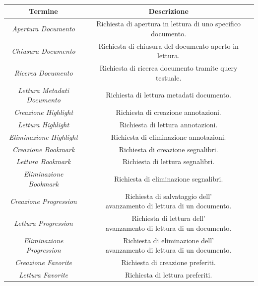 \begin{table}[H]
\centering
    \begin{tabular}{|c|c|}
         \hline
         \textbf{Termine} & \textbf{Descrizione}\\
         \hline
         \textit{Apertura Documento} & Richiesta di apertura in lettura di uno specifico documento.\\
         \hline
         \textit{Chiusura Documento} & Richiesta di chiusura del documento aperto in lettura.\\
         \hline
         \textit{Ricerca Documento} & Richiesta di ricerca documento tramite query testuale.\\
         \hline
         \specialcell{\textit{Lettura Metadati}\\\textit{Documento}} & Richiesta di lettura metadati documento.\\
         \hline
         \textit{Creazione Highlight} & Richiesta di creazione annotazioni.\\
         \hline
         \textit{Lettura Highlight} & Richiesta di lettura annotazioni.\\
         \hline
         \textit{Eliminazione Highlight} & Richiesta di eliminazione annotazioni.\\
         \hline
         \textit{Creazione Bookmark} & Richiesta di creazione segnalibri.\\
         \hline
         \textit{Lettura Bookmark} & Richiesta di lettura segnalibri.\\
         \hline
         \textit{Eliminazione Bookmark} & Richiesta di eliminazione segnalibri.\\
         \hline
         \textit{Creazione Progression} & \specialcell{Richiesta di salvataggio dell'\\avanzamento di lettura di un documento.}\\
         \hline
         \textit{Lettura Progression} &  \specialcell{Richiesta di lettura dell'\\avanzamento di lettura di un documento.}\\
         \hline
         \textit{Eliminazione Progression} &  \specialcell{Richiesta di eliminazione dell'\\avanzamento di lettura di un documento.}\\
         \hline
         \textit{Creazione Favorite} &  Richiesta di creazione preferiti.\\
         \hline
         \textit{Lettura Favorite} & Richiesta di lettura preferiti.\\

\end{tabular}
\end{table}
